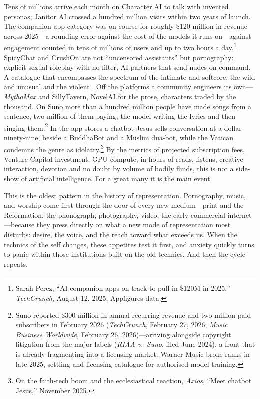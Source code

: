 Tens of millions arrive each month on Character.AI to talk with invented personas; Janitor AI crossed a hundred million visits within two years of launch. The companion-app category was on course for roughly \$120 million in revenue across 2025---a rounding error against the cost of the models it runs on---against engagement counted in tens of millions of users and up to two hours a day.\footnote{Sarah Perez, ``AI companion apps on track to pull in \$120M in 2025,'' \emph{TechCrunch}, August 12, 2025; Appfigures data.} SpicyChat and CrushOn are not ``uncensored assistants'' but pornography: explicit sexual roleplay with no filter, AI partners that send nudes on command. A catalogue that encompasses the spectrum of the intimate and softcore, the wild and unusual and the violent \cite{nsfw2026chatbots}. Off the platforms a community engineers its own---\emph{MythoMax} and SillyTavern, NovelAI for the prose, characters traded by the thousand. On Suno more than a hundred million people have made songs from a sentence, two million of them paying, the model writing the lyrics and then singing them.\footnote{Suno reported \$300 million in annual recurring revenue and two million paid subscribers in February 2026 (\emph{TechCrunch}, February 27, 2026; \emph{Music Business Worldwide}, February 26, 2026)---arriving alongside copyright litigation from the major labels (\emph{RIAA v.\ Suno}, filed June 2024), a front that is already fragmenting into a licensing market: Warner Music broke ranks in late 2025, settling and licensing catalogue for authorised model training.} In the app stores a chatbot Jesus sells conversation at a dollar ninety-nine, beside a BuddhaBot and a Muslim dua-bot, while the Vatican condemns the genre as idolatry.\footnote{On the faith-tech boom and the ecclesiastical reaction, \emph{Axios}, ``Meet chatbot Jesus,'' November 2025.} By the metrics of projected subscription fees, Venture Capital investment, GPU compute, in hours of reads, listens, creative interaction, devotion and no doubt by volume of bodily fluids, this is not a side-show of artificial intelligence. For a great many  it is the main event.

This is the oldest pattern in the history of representation. Pornography, music, and worship come first through the door of every new medium---print and the Reformation, the phonograph, photography, video, the early commercial internet---because they press directly on what a new mode of representation most disturbs: desire, the voice, and the reach toward what exceeds us. When the technics of the self changes, these appetites test it first, and anxiety quickly turns to panic within those institutions built on the old technics. And then the cycle repeats. 

